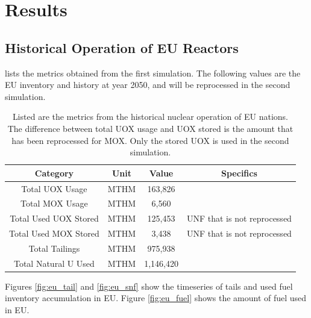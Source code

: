 \section{Results}

\subsection{Historical Operation of \gls{EU} Reactors}

 lists the metrics
obtained from the first simulation. The following
values are the \gls{EU} inventory and history at year 2050,
and will be reprocessed in the second simulation.

\begin{table}[h]
	\centering
		\begin{tabular}{cccc}
			\hline
			\textbf{Category} & \textbf{Unit} & \textbf{Value} & \textbf{Specifics}\\ 
			\hline
			Total UOX Usage & MTHM & 163,826 &  \\ 
			Total MOX Usage & MTHM & 6,560 & \\ 
			Total Used UOX Stored & MTHM & 125,453 & \gls{UNF} that is not reprocessed\\ 
			Total Used  MOX Stored & MTHM & 3,438 & \gls{UNF} that is not reprocessed \\ 
			Total Tailings & MTHM & 975,938 & \\ 
			Total Natural U Used & MTHM & 1,146,420 & \\ \hline
		\end{tabular}
		\caption{Listed are the metrics from the historical nuclear operation of \gls{EU} nations.
				 The difference between total \gls{UOX} usage and \gls{UOX} stored is the amount
				 that has been reprocessed for \gls{MOX}. Only the stored \gls{UOX} is used in the 
				 second simulation.}
		\label{tab:sim_result}
\end {table}
\FloatBarrier


Figures \ref{fig:eu_tail} and \ref{fig:eu_snf} show the 
timeseries of tails and used fuel inventory accumulation in \gls{EU}.
Figure \ref{fig:eu_fuel} shows the amount of fuel used in \gls{EU}.


